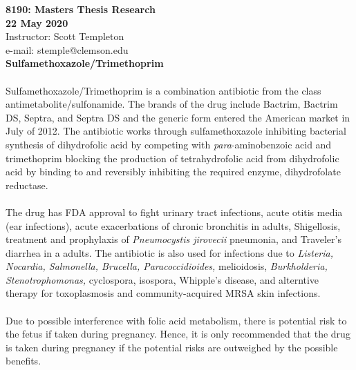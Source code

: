 
\let\counterwithout\relax
\let\counterwithin\relax
{}



\noindent \textbf{8190: Masters Thesis Research}\\
\noindent \textbf{22 May 2020}\\
\noindent Instructor: Scott Templeton \\
e-mail: stemple@clemson.edu\\

\noindent \textbf{Sulfamethoxazole/Trimethoprim}\\
\\
Sulfamethoxazole/Trimethoprim is a combination antibiotic from the class antimetabolite/sulfonamide. The brands of the drug include Bactrim, Bactrim DS, Septra, and Septra DS and the generic form entered the American market in July of 2012. The antibiotic works through sulfamethoxazole inhibiting bacterial synthesis of dihydrofolic acid by competing with \textit{para}-aminobenzoic acid and trimethoprim blocking the production of tetrahydrofolic acid from dihydrofolic acid by binding to and reversibly inhibiting the required enzyme, dihydrofolate reductase.\\
\\
The drug has FDA approval to fight urinary tract infections, acute otitis media (ear infections), acute exacerbations of chronic bronchitis in adults, Shigellosis, treatment and prophylaxis of \textit{Pneumocystis jirovecii} pneumonia, and Traveler's diarrhea in a adults. The antibiotic is also used for infections due to \textit{Listeria, Nocardia, Salmonella, Brucella, Paracoccidioides,} melioidosis, \textit{Burkholderia, Stenotrophomonas,} cyclospora, isospora, Whipple's disease, and alterntive therapy for toxoplasmosis and community-acquired MRSA skin infections.\\
\\
Due to possible interference with folic acid metabolism, there is potential risk to the fetus if taken during pregnancy. Hence, it is only recommended that the drug is taken during pregnancy if the potential risks are outweighed by the possible benefits.\\

